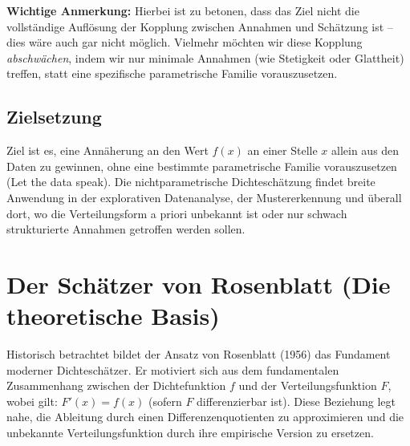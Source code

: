 \documentclass[a4paper, 11pt]{scrartcl}
\begin{document}
\textbf{Wichtige Anmerkung:} Hierbei ist zu betonen, dass das Ziel nicht die vollständige Auflösung der Kopplung zwischen Annahmen und Schätzung ist – dies wäre auch gar nicht möglich. Vielmehr möchten wir diese Kopplung \textit{abschwächen}, indem wir nur minimale Annahmen (wie Stetigkeit oder Glattheit) treffen, statt eine spezifische parametrische Familie vorauszusetzen.

\subsection*{Zielsetzung}

Ziel ist es, eine Annäherung an den Wert $f(x)$ an einer Stelle $x$ allein aus den Daten zu gewinnen, ohne eine bestimmte parametrische Familie vorauszusetzen (\glqq Let the data speak\grqq). Die nichtparametrische Dichteschätzung findet breite Anwendung in der explorativen Datenanalyse, der Mustererkennung und überall dort, wo die Verteilungsform a priori unbekannt ist oder nur schwach strukturierte Annahmen getroffen werden sollen.

\section{Der Schätzer von Rosenblatt (Die theoretische Basis)}

Historisch betrachtet bildet der Ansatz von Rosenblatt \cite{Rosenblatt1956} (1956) das Fundament moderner Dichteschätzer. Er motiviert sich aus dem fundamentalen Zusammenhang zwischen der Dichtefunktion $f$ und der Verteilungsfunktion $F$, wobei gilt: $F'(x) = f(x)$ (sofern $F$ differenzierbar ist). Diese Beziehung legt nahe, die Ableitung durch einen Differenzenquotienten zu approximieren und die unbekannte Verteilungsfunktion durch ihre empirische Version zu ersetzen.
\end{document}
